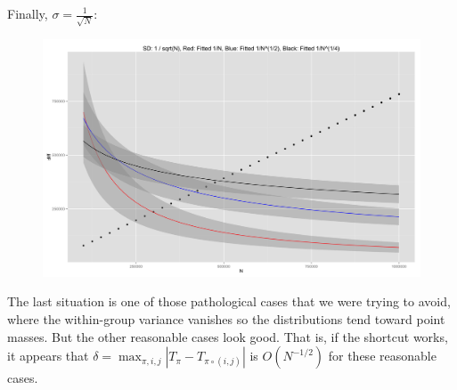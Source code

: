 Finally, $\sigma = \frac{1}{\sqrt{N}}$:
\begin{figure}[!ht]
  \centering
  \includegraphics[scale=.06]{./simulations/better_bound_condition/rate_plot_3.png}
\end{figure}

The last situation is one of those pathological cases that we were
trying to avoid, where the within-group variance vanishes so the
distributions tend toward point masses.  But the other reasonable
cases look good.  That is, if the shortcut works, it appears that 
$\delta = \max_{\pi, i, j} |T_{\pi} - T_{\pi \circ (i, j)}|$ is
$O(N^{-1/2})$ for these reasonable cases.
